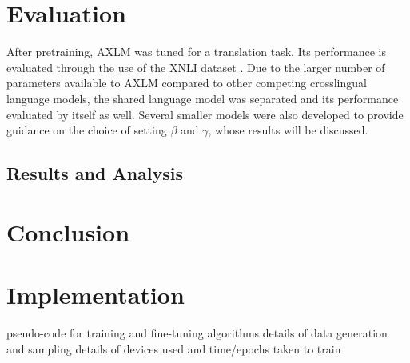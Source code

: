 \documentclass[10pt,letterpaper,twocolumn]{article}
\begin{document}
\section{Evaluation}
After pretraining, AXLM was tuned for a translation task.  Its performance is evaluated through the use of the XNLI dataset \cite{}.  Due to the larger number of parameters available to AXLM compared to other competing crosslingual language models, the shared language model was separated and its performance evaluated by itself as well.  Several smaller models were also developed to provide guidance on the choice of setting $\beta$ and $\gamma$, whose results will be discussed.

\subsection{Results and Analysis}

\section{Conclusion}

\nocite{*}



\section{Implementation}
pseudo-code for training and fine-tuning algorithms
details of data generation and sampling
details of devices used and time/epochs taken to train
\end{document}
